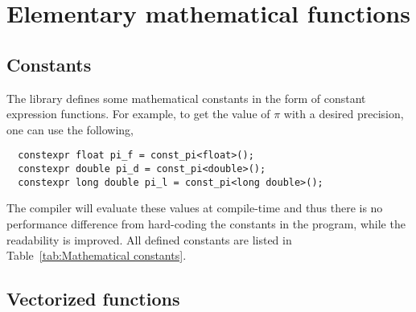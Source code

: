 \chapter{Elementary mathematical functions}
\label{chap:Elementary mathemtical functions}

\section{Constants}
\label{sec:Constants}

The library defines some mathematical constants in the form of constant
expression functions. For example, to get the value of $\pi$ with a desired
precision, one can use the following,
\begin{Verbatim}
  constexpr float pi_f = const_pi<float>();
  constexpr double pi_d = const_pi<double>();
  constexpr long double pi_l = const_pi<long double>();
\end{Verbatim}
The compiler will evaluate these values at compile-time and thus there is no
performance difference from hard-coding the constants in the program, while the
readability is improved. All defined constants are listed in
Table~\ref{tab:Mathematical constants}.

\section{Vectorized functions}
\label{sec:Vectorized functions}

